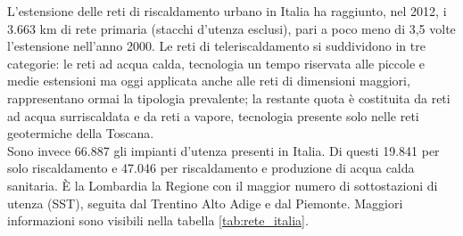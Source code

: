 \documentclass[laurea,oneside,11pt]{USiena_tesiLM}
\begin{document}
L'estensione delle reti di riscaldamento urbano in Italia ha raggiunto, nel 2012, i 3.663 km di rete primaria (stacchi d'utenza esclusi), pari a poco meno di 3,5 volte l'estensione nell'anno 2000.
Le reti di teleriscaldamento si suddividono in tre categorie: le reti ad acqua calda, tecnologia un tempo riservata alle piccole e medie estensioni ma oggi applicata anche alle reti di dimensioni maggiori, rappresentano ormai la tipologia prevalente; la restante quota è costituita da reti ad acqua surriscaldata e da reti a vapore, tecnologia presente solo nelle reti geotermiche della Toscana.\\

Sono invece 66.887 gli impianti d'utenza presenti in Italia. Di questi 19.841 per solo riscaldamento e 47.046 per riscaldamento e
produzione di acqua calda sanitaria. \`E la Lombardia la Regione con il maggior numero di sottostazioni di utenza (SST), seguita dal Trentino Alto Adige e dal Piemonte. Maggiori informazioni sono visibili nella tabella \ref{tab:rete_italia}.
\end{document}
